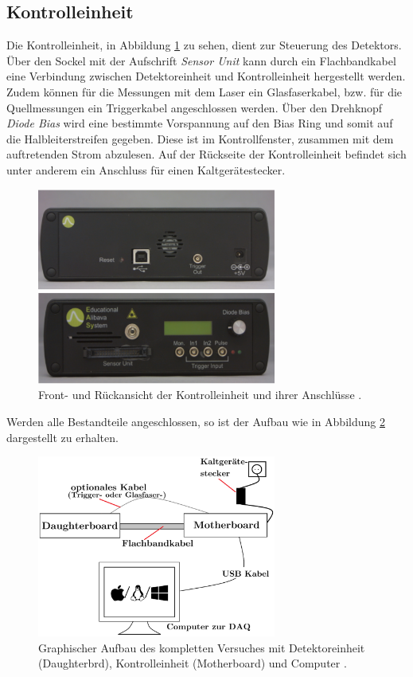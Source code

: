\subsection{Kontrolleinheit}
Die Kontrolleinheit, in Abbildung \ref{fig:control} zu sehen, dient zur Steuerung
des Detektors. Über den Sockel mit der Aufschrift \textit{Sensor Unit} kann durch
ein  Flachbandkabel eine Verbindung zwischen Detektoreinheit und Kontrolleinheit
hergestellt werden. Zudem können für die Messungen mit dem Laser ein Glasfaserkabel,
bzw. für die Quellmessungen ein Triggerkabel angeschlossen werden. Über den
Drehknopf \textit{Diode Bias} wird eine bestimmte Vorspannung auf den Bias Ring
und somit auf die Halbleiterstreifen gegeben. Diese ist im Kontrollfenster,
zusammen mit dem auftretenden Strom abzulesen.
Auf der Rückseite der Kontrolleinheit befindet sich unter anderem ein Anschluss
für einen Kaltgerätestecker.
\begin{figure}[htb]
  \centering
  \includegraphics[width=0.7\textwidth]{images/Control.png}
  \caption{Front- und Rückansicht der Kontrolleinheit und ihrer Anschlüsse \cite{anleitung}.}
  \label{fig:control}
\end{figure}
\FloatBarrier
Werden alle Bestandteile angeschlossen, so ist der Aufbau wie in Abbildung
\ref{fig:aufbau} dargestellt zu erhalten.
\begin{figure}[htb]
  \centering
  \includegraphics[width=0.7\textwidth]{images/Aufbau.png}
  \caption{Graphischer Aufbau des kompletten Versuches mit Detektoreinheit
  (Daughterbrd), Kontrolleinheit (Motherboard) und Computer \cite{anleitung}.}
  \label{fig:aufbau}
\end{figure}
